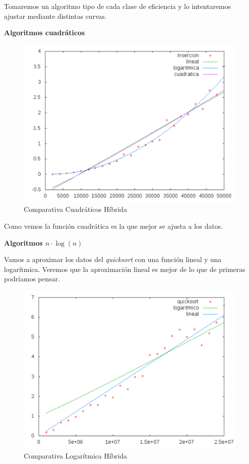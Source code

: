 \documentclass[a4paper, 11pt]{article}
\begin{document}
Tomaremos un algoritmo tipo de cada clase de eficiencia y lo intentaremos ajustar mediante distintas curvas.

\vspace{1cm}
\textbf{Algoritmos cuadráticos}

\begin{figure}[H]\includegraphics[width=13cm]{img/cuad_hibrida.pdf} \centering
	\caption{Comparativa Cuadráticos Híbrida}\end{figure}

Como vemos la función cuadrática es la que mejor se ajusta a los datos.

\vspace{1cm}

\textbf{Algoritmos $n \cdot \log(n)$}

Vamos a aproximar los datos del \textit{quicksort} con una función lineal y una logarítmica. Veremos que la aproximación lineal es mejor de lo que de primeras podríamos pensar.


\begin{figure}[H]\includegraphics[width=13cm]{img/log_hibrida.pdf} \centering
	\caption{Comparativa Logarítmica Híbrida}\end{figure}
\end{document}
